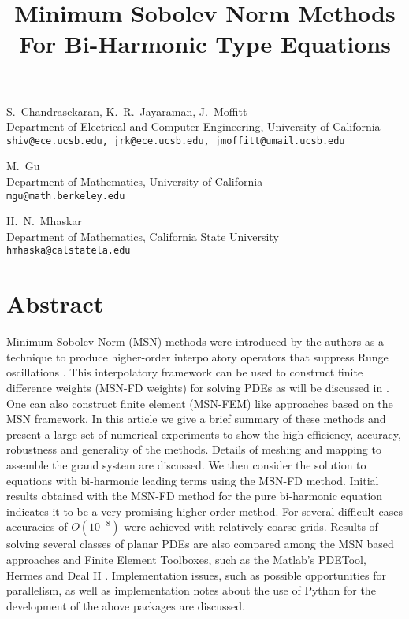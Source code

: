 \title{Minimum Sobolev Norm Methods For Bi-Harmonic Type Equations}
\author{} \institute{}
\maketitle

\begin{center}
{\large S.~Chandrasekaran, \underline{K.~R.~Jayaraman}, J.~Moffitt}\\
Department of Electrical and Computer Engineering, University of California\\
{\tt shiv@ece.ucsb.edu, jrk@ece.ucsb.edu, jmoffitt@umail.ucsb.edu}\\
\vspace{4mm}

{\large M.~Gu}\\
Department of Mathematics, University of California\\
{\tt mgu@math.berkeley.edu}\\
\vspace{4mm}

{\large H.~N.~Mhaskar}\\
Department of Mathematics, California State University\\
{\tt hmhaska@calstatela.edu}
\end{center}

\section*{Abstract}
Minimum Sobolev Norm (MSN) methods were introduced by the authors as a technique to produce higher-order interpolatory operators that suppress Runge oscillations \cite{MSN1,MSN2}. This interpolatory framework can be used to construct finite difference weights (MSN-FD weights) for solving PDEs as will be discussed in \cite{MSNFD}. One can also construct finite element (MSN-FEM) like approaches based on the MSN framework. In this article we give a brief summary of these methods and present a large set of numerical experiments to show the high efficiency, accuracy, robustness and generality of the methods. Details of meshing and mapping to assemble the grand system are discussed. We then consider the solution to equations with bi-harmonic leading terms using the MSN-FD method. Initial results obtained with the MSN-FD method for the pure bi-harmonic equation indicates it to be a very promising higher-order method. For several difficult cases accuracies of $O(10^{-8})$ were achieved with relatively coarse grids. Results of solving several classes of planar PDEs are also compared among the MSN based approaches and Finite Element Toolboxes, such as the Matlab's PDETool, Hermes \cite{Hermes} and Deal II \cite{Deal2}. Implementation issues, such as possible opportunities for parallelism, as well as implementation notes about the use of Python for the development of the above packages are discussed.

